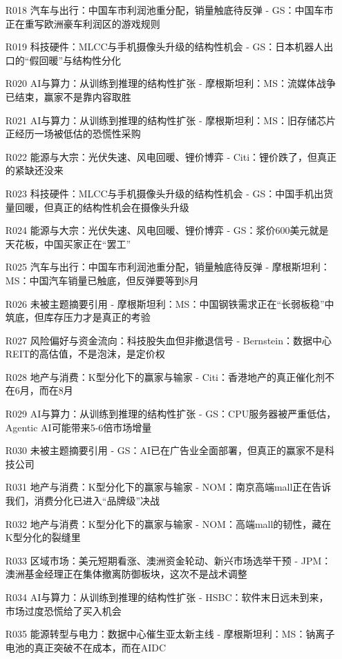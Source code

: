 \documentclass[11pt]{ctexart}
\begin{document}
\begin{itemize}
  \item [R018] 汽车与出行：中国车市利润池重分配，销量触底待反弹 - GS：中国车市正在重写欧洲豪车利润区的游戏规则
  \item [R019] 科技硬件：MLCC与手机摄像头升级的结构性机会 - GS：日本机器人出口的“假回暖”与结构性分化
  \item [R020] AI与算力：从训练到推理的结构性扩张 - 摩根斯坦利：MS：流媒体战争已结束，赢家不是靠内容取胜
  \item [R021] AI与算力：从训练到推理的结构性扩张 - 摩根斯坦利：MS：旧存储芯片正经历一场被低估的恐慌性采购
  \item [R022] 能源与大宗：光伏失速、风电回暖、锂价博弈 - Citi：锂价跌了，但真正的紧缺还没来
  \item [R023] 科技硬件：MLCC与手机摄像头升级的结构性机会 - GS：中国手机出货量回暖，但真正的结构性机会在摄像头升级
  \item [R024] 能源与大宗：光伏失速、风电回暖、锂价博弈 - GS：浆价600美元就是天花板，中国买家正在“罢工”
  \item [R025] 汽车与出行：中国车市利润池重分配，销量触底待反弹 - 摩根斯坦利：MS：中国汽车销量已触底，但反弹要等到8月
  \item [R026] 未被主题摘要引用 - 摩根斯坦利：MS：中国钢铁需求正在“长弱板稳”中筑底，但库存压力才是真正的考验
  \item [R027] 风险偏好与资金流向：科技股失血但非撤退信号 - Bernstein：数据中心REIT的高估值，不是泡沫，是定价权
  \item [R028] 地产与消费：K型分化下的赢家与输家 - Citi：香港地产的真正催化剂不在6月，而在8月
  \item [R029] AI与算力：从训练到推理的结构性扩张 - GS：CPU服务器被严重低估，Agentic AI可能带来5-6倍市场增量
  \item [R030] 未被主题摘要引用 - GS：AI已在广告业全面部署，但真正的赢家不是科技公司
  \item [R031] 地产与消费：K型分化下的赢家与输家 - NOM：南京高端mall正在告诉我们，消费分化已进入“品牌级”决战
  \item [R032] 地产与消费：K型分化下的赢家与输家 - NOM：高端mall的韧性，藏在K型分化的裂缝里
  \item [R033] 区域市场：美元短期看涨、澳洲资金轮动、新兴市场选举干预 - JPM：澳洲基金经理正在集体撤离防御板块，这次不是战术调整
  \item [R034] AI与算力：从训练到推理的结构性扩张 - HSBC：软件末日远未到来，市场过度恐慌给了买入机会
  \item [R035] 能源转型与电力：数据中心催生亚太新主线 - 摩根斯坦利：MS：钠离子电池的真正突破不在成本，而在AIDC

\end{itemize}
\end{document}
